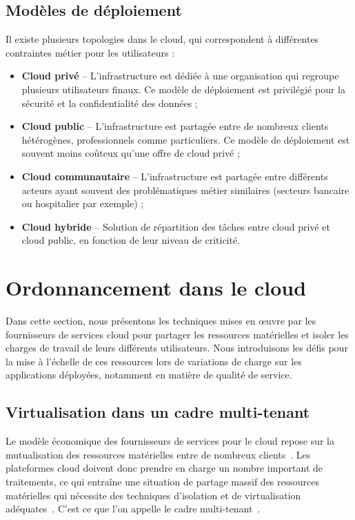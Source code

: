 \subsection{Modèles de déploiement}

Il existe plusieurs topologies dans le cloud, qui correspondent à différentes contraintes métier pour les utilisateurs :

\begin{itemize}
    \item \textbf{Cloud privé} -- L'infrastructure est dédiée à une organisation qui regroupe plusieurs utilisateurs finaux. Ce modèle de déploiement est privilégié pour la sécurité et la confidentialité des données ;
    \item \textbf{Cloud public} -- L'infrastructure est partagée entre de nombreux clients hétérogènes, professionnels comme particuliers. Ce modèle de déploiement est souvent moins coûteux qu'une offre de cloud privé ;
    \item \textbf{Cloud communautaire} -- L'infrastructure est partagée entre différents acteurs ayant souvent des problématiques métier similaires (secteurs bancaire ou hospitalier par exemple) ;
    \item \textbf{Cloud hybride} -- Solution de répartition des tâches entre cloud privé et cloud public, en fonction de leur niveau de criticité.
\end{itemize}

\section{Ordonnancement dans le cloud}

Dans cette section, nous présentons les techniques mises en œuvre par les fournisseurs de services cloud pour partager les ressources matérielles et isoler les charges de travail de leurs différents utilisateurs. Nous introduisons les défis pour la mise à l'échelle de ces ressources lors de variations de charge sur les applications déployées, notamment en matière de qualité de service.

\subsection{Virtualisation dans un cadre multi-tenant}
\label{section:background-virtualization}

Le modèle économique des fournisseurs de services pour le cloud repose sur la mutualisation des ressources matérielles entre de nombreux clients~\cite{hayesCloudComputing2008}. Les plateformes cloud doivent donc prendre en charge un nombre important de traitements, ce qui entraîne une situation de partage massif des ressources matérielles qui nécessite des techniques d'isolation et de virtualisation adéquates~\cite{vaqueroLockingSkySurvey2011}. C'est ce que l'on appelle le cadre multi-tenant~\cite{weissmanDesignForceCom2009}.


